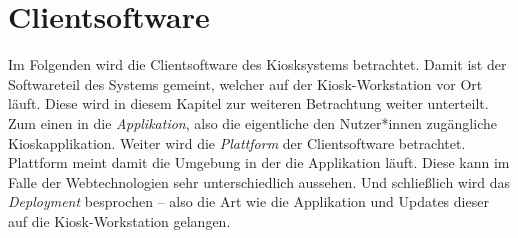 \section{Clientsoftware}
\label{sec:frontend}

\iffalse
- viele Anforderungen
- Fokus der Thesis
- beschreibt alle Schritte um eine Webandwendung in eine gelunge Kioskapplikation zu bringen
- Was meint Frontend: die eigentliche Kioskapplikation, Plattform: die Umgebung der Applikation, Deployment der Applikation
- SPA Routing im Frontend
- rein mit Webtechnologien, und noch weiter rein mit Browsertechnologien: beschränken auf HTML, CSS und JS
- mit Electron bindet man sich an die Plattform
\fi

Im Folgenden wird die Clientsoftware des Kiosksystems betrachtet. Damit ist der 
Softwareteil des Systems gemeint, welcher auf der Kiosk-Workstation vor 
Ort läuft. Diese wird in diesem Kapitel zur weiteren Betrachtung 
weiter unterteilt. Zum einen in die \emph{Applikation}, 
also die eigentliche den Nutzer*innen zugängliche Kioskapplikation.
Weiter wird die \emph{Plattform} der Clientsoftware betrachtet.
Plattform meint damit die Umgebung in der die Applikation läuft. Diese kann 
im Falle der Webtechnologien sehr unterschiedlich aussehen. 
Und schließlich wird das \emph{Deployment} besprochen -- also die Art wie die Applikation und 
Updates dieser auf die Kiosk-Workstation gelangen.\\




